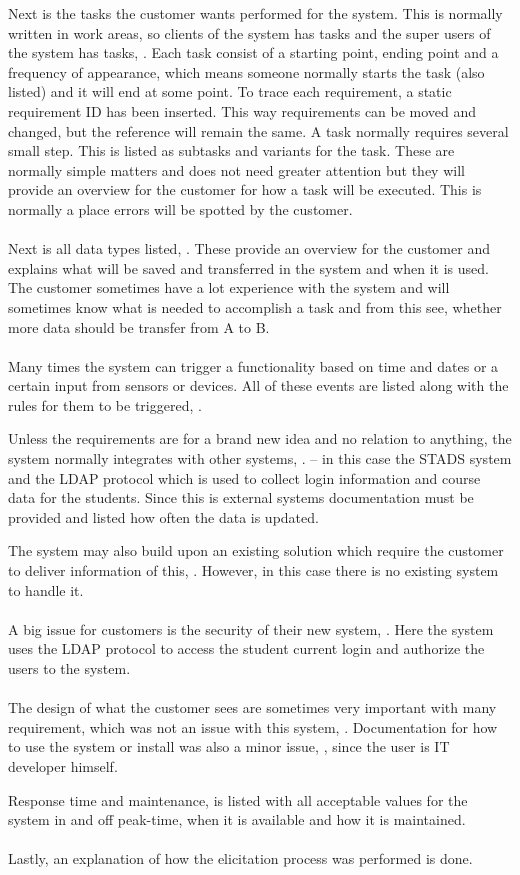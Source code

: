 \documentclass[Main]{subfiles}
\begin{document}
Next is the tasks the customer wants performed for the system.
This is normally written in work areas, so clients of the system has tasks and the super users of the system has tasks, \parencite[8-13]{HI4}.
Each task consist of a starting point, ending point and a frequency of appearance, which means someone normally starts the task (also listed) and it will end at some point.
To trace each requirement, a static requirement ID has been inserted.
This way requirements can be moved and changed, but the reference will remain the same.
A task normally requires several small step.
This is listed as subtasks and variants for the task. 
These are normally simple matters and does not need greater attention but they will provide an overview for the customer for how a task will be executed.
This is normally a place errors will be spotted by the customer.
\\
\\
Next is all data types listed, \parencite[14-17]{HI4}.
These provide an overview for the customer and explains what will be saved and transferred in the system and when it is used.
The customer sometimes have a lot experience with the system and will sometimes know what is needed to accomplish a task and from this see, whether more data should be transfer from A to B.
\\
\\
Many times the system can trigger a functionality based on time and dates or a certain input from sensors or devices.
All of these events are listed along with the rules for them to be triggered, \parencite[18]{HI4}.

Unless the requirements are for a brand new idea and no relation to anything, the system normally integrates with other systems, \parencite[19-20]{HI4}. -- in this case the STADS system and the LDAP protocol which is used to collect login information and course data for the students. 
Since this is external systems documentation must be provided and listed how often the data is updated.

The system may also build upon an existing solution which require the customer to deliver information of this, \parencite[21]{HI4}.
However, in this case there is no existing system to handle it.
\\
\\
A big issue for customers is the security of their new system, \parencite[22]{HI4}.
Here the system uses the LDAP protocol to access the student current login and authorize the users to the system.
\\
\\
The design of what the customer sees are sometimes very important with many requirement, which was not an issue with this system, \parencite[23]{HI4}.
Documentation for how to use the system or install was also a minor issue, \parencite[24]{HI4}, since the user is IT developer himself.

Response time and maintenance, \parencite[25-27]{HI4} is listed with all acceptable values for the system in and off peak-time, when it is available and how it is maintained.
\\
\\
Lastly, an explanation of how the elicitation process was performed is done.
\end{document}
